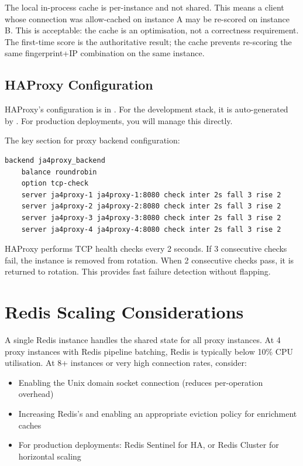 The local in-process cache is per-instance and not shared. This means a client
whose connection was allow-cached on instance A may be re-scored on instance B.
This is acceptable: the cache is an optimisation, not a correctness requirement.
The first-time score is the authoritative result; the cache prevents re-scoring
the same fingerprint+IP combination on the same instance.

\subsection{HAProxy Configuration}

HAProxy's configuration is in . For the development
stack, it is auto-generated by . For production
deployments, you will manage this directly.

The key section for proxy backend configuration:

\begin{lstlisting}[language=bash, numbers=none]
backend ja4proxy_backend
    balance roundrobin
    option tcp-check
    server ja4proxy-1 ja4proxy-1:8080 check inter 2s fall 3 rise 2
    server ja4proxy-2 ja4proxy-2:8080 check inter 2s fall 3 rise 2
    server ja4proxy-3 ja4proxy-3:8080 check inter 2s fall 3 rise 2
    server ja4proxy-4 ja4proxy-4:8080 check inter 2s fall 3 rise 2
\end{lstlisting}

HAProxy performs TCP health checks every 2 seconds. If 3 consecutive checks fail,
the instance is removed from rotation. When 2 consecutive checks pass, it is
returned to rotation. This provides fast failure detection without flapping.

\section{Redis Scaling Considerations}

A single Redis instance handles the shared state for all proxy instances. At 4
proxy instances with Redis pipeline batching, Redis is typically below 10\% CPU
utilisation. At 8+ instances or very high connection rates, consider:

\begin{itemize}
  \item Enabling the Unix domain socket connection (reduces per-operation overhead)
  \item Increasing Redis's  and enabling an appropriate eviction
    policy for enrichment caches
  \item For production deployments: Redis Sentinel for HA, or Redis Cluster for
    horizontal scaling
\end{itemize}

